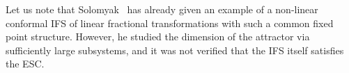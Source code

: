 \documentclass[12pt,]{article}
\def\cref#1{\ref{#1}}%
\theoremstyle{definition}
\theoremstyle{remark}
\newcommand{\0}{\mathbf{0}}
\begin{document}
Let us note that Solomyak~\cite{Solomyak24} has already given an example of a non-linear conformal
IFS of linear fractional transformations with such a common fixed point structure.
However, he studied the dimension of the attractor via sufficiently large subsystems, and it was not
verified that the IFS itself satisfies the ESC.



%
%
%
%


\end{document}
